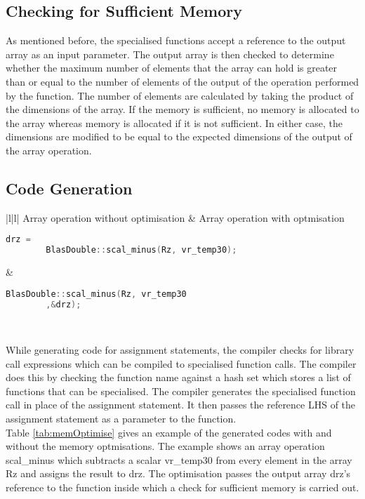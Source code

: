 \subsection{Checking for Sufficient Memory}

As mentioned before, the specialised functions accept a reference to the output array as an input parameter. The output array is then checked to determine whether the maximum number of elements that the array can hold is greater than or equal to the number of elements of the output of the operation performed by the function. The number of elements are calculated by taking the product of the dimensions of the array. If the memory is sufficient, no memory is allocated to the array whereas memory is allocated if it is not sufficient. In either case, the dimensions are modified to be equal to the expected dimensions of the output of the array operation.   
\subsection{Code Generation}
\begin{table}[htbp]
	\centering
  \begin{tabular}{|l|l|}
  \hline
  Array operation without optimisation & 
Array operation with optmisation 
   \\
  \hline
  
  {
  \begin{lstlisting}[language=c,frame=none, numbers=none]
	drz = 
		BlasDouble::scal_minus(Rz, vr_temp30);
  \end{lstlisting}
  } &
   {
   \begin{lstlisting}[language=c,frame=none, numbers=none]
	 BlasDouble::scal_minus(Rz, vr_temp30
		,&drz);
   \end{lstlisting}
   } \\
   \hline
   \end{tabular}
   \caption[Generated code with and without memory optimisations]{Table shows the generated code with and without memory optimisations}
   \label{tab:memOptimise}
   \end{table}

While generating code for assignment statements, the compiler checks for library call expressions which can be compiled to specialised function calls. The compiler does this by checking the function name against a hash set which stores a list of functions that can be specialised. The compiler generates the specialised function call in place of the assignment statement. It then passes the reference LHS of the assignment statement as a parameter to the function. \\
Table \ref{tab:memOptimise} gives an example of the generated codes with and without the memory optmisations. The example shows an array operation scal\_minus which subtracts a scalar vr\_temp30 from every element in the array Rz and assigns the result to drz.  The optimisation passes the output array drz's reference to the function inside which a check for sufficient memory is carried out.
